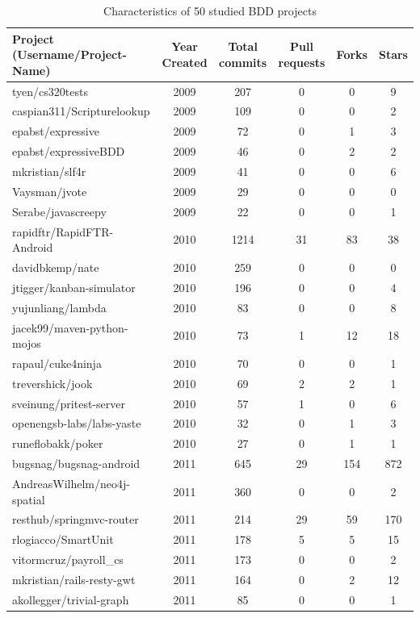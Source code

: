 \begin{table}
	\normalsize
	\caption{Characteristics of 50 studied BDD projects}
	\center
	
	\begin{tabular}{p{6cm} c c c c c}
		\textbf{Project} (Username/Project-Name) & \textbf{Year Created} & \textbf{Total commits} & \textbf{Pull requests} & \textbf{Forks} & \textbf{Stars}\\
		\hline
tyen/cs320tests & 2009 & 207 & 0 & 0 & 9 \\
caspian311/Scripturelookup & 2009 & 109 & 0 & 0 & 2 \\
epabst/expressive & 2009 & 72 & 0 & 1 & 3 \\
epabst/expressiveBDD & 2009 & 46 & 0 & 2 & 2 \\
mkristian/slf4r & 2009 & 41 & 0 & 0 & 6 \\
Vaysman/jvote & 2009 & 29 & 0 & 0 & 0 \\
Serabe/javascreepy & 2009 & 22 & 0 & 0 & 1 \\
rapidftr/RapidFTR-Android & 2010 & 1214 & 31 & 83 & 38 \\
davidbkemp/nate & 2010 & 259 & 0 & 0 & 0 \\
jtigger/kanban-simulator & 2010 & 196 & 0 & 0 & 4 \\
yujunliang/lambda & 2010 & 83 & 0 & 0 & 8 \\
jacek99/maven-python-mojos & 2010 & 73 & 1 & 12 & 18 \\
rapaul/cuke4ninja & 2010 & 70 & 0 & 0 & 1 \\
trevershick/jook & 2010 & 69 & 2 & 2 & 1 \\
sveinung/pritest-server & 2010 & 57 & 1 & 0 & 6 \\
openengsb-labs/labs-yaste & 2010 & 32 & 0 & 1 & 3 \\
runeflobakk/poker & 2010 & 27 & 0 & 1 & 1 \\
bugsnag/bugsnag-android & 2011 & 645 & 29 & 154 & 872 \\
AndreasWilhelm/neo4j-spatial & 2011 & 360 & 0 & 0 & 2 \\
resthub/springmvc-router & 2011 & 214 & 29 & 59 & 170 \\
rlogiacco/SmartUnit & 2011 & 178 & 5 & 5 & 15 \\
vitormcruz/payroll\_cs & 2011 & 173 & 0 & 0 & 2 \\
mkristian/rails-resty-gwt & 2011 & 164 & 0 & 2 & 12 \\
akollegger/trivial-graph & 2011 & 85 & 0 & 0 & 1 \\

\end{tabular}
\end{table}
